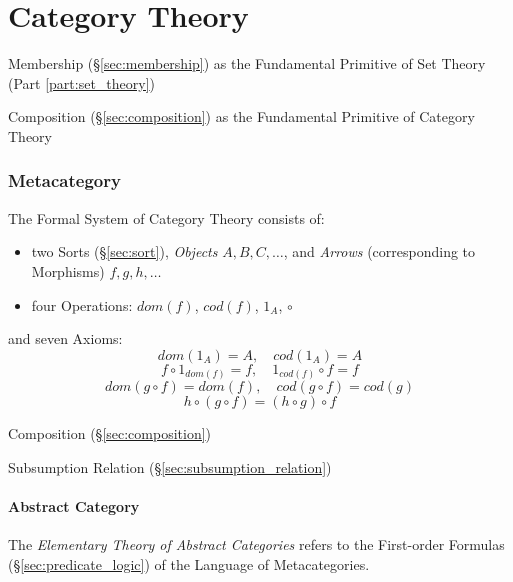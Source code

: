 \part{Category Theory}\label{part:category_theory}
\cite{awodey06}\cite{maclane69}

Membership (\S\ref{sec:membership}) as the Fundamental Primitive of
Set Theory (Part \ref{part:set_theory})

Composition (\S\ref{sec:composition}) as the Fundamental Primitive of
Category Theory



\section{Metacategory}\label{sec:metacategory}

The Formal System of Category Theory consists of:
\begin{itemize}
\item two Sorts (\S\ref{sec:sort}), \emph{Objects} $A,B,C,\ldots$, and
  \emph{Arrows} (corresponding to Morphisms) $f,g,h,\ldots$
\item four Operations: $dom(f)$, $cod(f)$, $1_A$, $\circ$
\end{itemize}
and seven Axioms:
\[
  dom(1_A) = A,\quad cod(1_A) = A
\]\[
  f \circ 1_{dom(f)} = f, \quad 1_{cod(f)} \circ f = f
\]\[
  dom(g\circ f) = dom(f), \quad cod(g \circ f) = cod(g)
\]\[
  h \circ (g \circ f) = (h \circ g) \circ f
\]

Composition (\S\ref{sec:composition})

Subsumption Relation (\S\ref{sec:subsumption_relation})



\subsection{Abstract Category}\label{sec:abstract_category}

The \emph{Elementary Theory of Abstract Categories} refers to the
First-order Formulas (\S\ref{sec:predicate_logic}) of the Language
of Metacategories.

